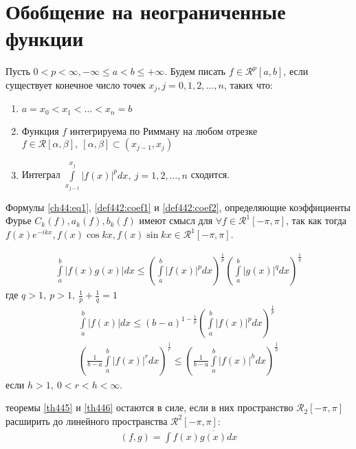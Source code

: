 \section{Обобщение на неограниченные функции}
\begin{definition}
  Пусть $0 < p < \infty, -\infty \leq a < b \leq + \infty$. Будем писать $f \in
  \mathcal{R}^p[a,b]$, если существует конечное число точек $x_j, j = 0, 1, 2, \dots, n$,
  таких что:
  \begin{enumerate}
    \item $a = x_0 < x_1 < \dots < x_n = b$
    \item Функция $f$ интегрируема по Римману на любом отрезке $f \in
      \mathcal{R}[\alpha, \beta], \ [\alpha, \beta] \subset (x_{j-1}, x_j)$
    \item Интеграл $\int\limits_{x_{j-1}}^{x_j} |f(x)|^p dx, \ j = 1, 2,
      \dots, n$ сходится.
  \end{enumerate}
\end{definition}

\begin{remark}
  Формулы \eqref{ch44:eq1}, \eqref{def442:coef1} и \eqref{def442:coef2},
  определяющие коэффициенты Фурье $C_k(f), a_k(f), b_k(f)$ имеют смысл для
  $\forall f \in \mathcal{R}^1[-\pi, \pi]$, так как тогда $f(x) e^{-ikx}, f(x) \cos kx,
  f(x) \sin kx \in \mathcal{R}^1[-\pi, \pi]$.
\end{remark}

\begin{definition}
  \begin{gather*}
    \int\limits_a^b |f(x) g(x)| dx \leq \left(\int\limits_a^b |f(x)|^p dx \right)
    ^{\frac{1}{p}}
    \left(\int\limits_a^b |g(x)|^q dx\right)^{\frac{1}{q}}
  \end{gather*}
  где $q > 1, \ p > 1, \ \frac{1}{p} + \frac{1}{q} = 1$
  \begin{gather*}
    \int\limits_a^b |f(x)| dx \leq (b - a)^{1 - \frac{1}{p}}
    \left(\int\limits_a^b |f(x)|^p dx \right)^{\frac{1}{p}} \\
    \left(\frac{1}{b-a} \int\limits_a^b |f(x)|^{r} dx \right)
    ^{\frac{1}{r}} \leq \left(\frac{1}{b-a} \int\limits_a^b |f(x)|^{h} dx
    \right) ^{\frac{1}{h}}
  \end{gather*}
  если $h > 1, \ 0 < r < h < \infty$.
\end{definition}

\begin{approval}
  теоремы \eqref{th445} и \eqref{th446} остаются в силе, если в них
  пространство $\mathcal{R}_2[-\pi, \pi]$ расширить до линейного пространства
  $\mathcal{R}^2[-\pi, \pi]$:
  \begin{gather*}
    (f, g) = \int f(x) \overline{g(x)} dx
  \end{gather*}
\end{approval}

